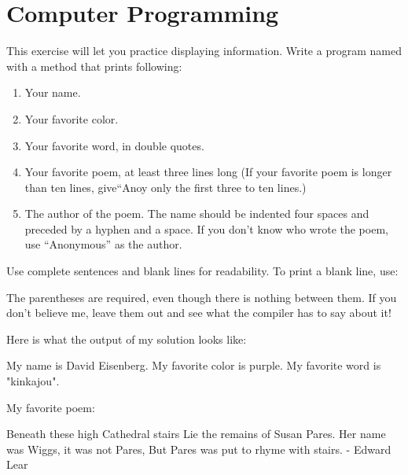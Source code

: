 \chapter{Computer Programming}

\begin{exercise}
This exercise will let you practice displaying information.  Write a program named  with a  method that prints following:

\begin{enumerate}
\item Your name.
\item Your favorite color.
\item Your favorite word, in double quotes.
\item Your favorite poem, at least three lines long (If your favorite poem is longer than ten lines, give``Anoy only the first three to ten lines.)
\item The author of the poem. The name should be indented four spaces and preceded by a hyphen and a space. If you don't know who wrote the poem, use ``Anonymous'' as the author.
\end{enumerate}

Use complete sentences and blank lines for readability.  To print a blank line, use:


The parentheses are required, even though there is nothing between them. If you don't believe me, leave them out and see what the compiler has to say about it!

Here is what the output of my solution looks like:

\begin{stdout}
My name is David Eisenberg.
My favorite color is purple.
My favorite word is "kinkajou".

My favorite poem:

Beneath these high Cathedral stairs
Lie the remains of Susan Pares.
Her name was Wiggs, it was not Pares,
But Pares was put to rhyme with stairs.
    - Edward Lear
\end{stdout}
\end{exercise}
